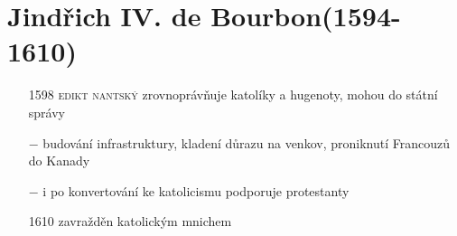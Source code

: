 \documentclass{article}
\begin{document}
\section*{Jindřich IV. de Bourbon(1594-1610)}
\begin{itemize}
    \vspace{-0.5em}
    \setlength\itemsep{0.15em}
    \item[1598] \textsc{edikt nantský} zrovnoprávňuje katolíky a hugenoty, mohou do státní správy
    \item[$-$] budování infrastruktury, kladení důrazu na venkov, proniknutí Francouzů do Kanady
    \item[$-$] i po konvertování ke katolicismu podporuje protestanty
    \item[1610] zavražděn katolickým mnichem   
\end{itemize}
\end{document}
